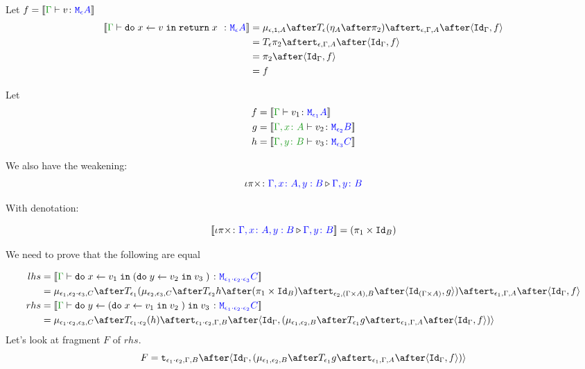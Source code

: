 \documentclass{report}
\begin{document}

Let $f = \deno{\gtyperelation{v}{\mea}}$ 
    \begin{equation}
    \begin{split}
        \deno{\gtyperelation{\doin{x}{v}{\return{x}}}{\mea}}  & = \bind{\e}{\1}{A} \after \T{\e}{(\point{A} \after \pp)} \after \tstrength{\e}{\G}{A}\after \pr{\idg}{f} \\
        & = \T{\e}{\pp} \after \tstrength{\e}{\G}{A} \after \pr {\idg}{f} \\
        & = \pp \after \pr{\idg}{f}\\
        & = f
    \end{split}
\end{equation}



Let
\begin{align*}
    f ={}& \deno{\gtyperelation{v_1}{\M{\e_1}{A}}}\\
    g ={}& \deno{\typerelation{\gax}{v_2}{\M{\e_2}{B}}}\\
    h ={}& \deno{\typerelation{\gby}{v_3}{\M{\e_3}{C}}}
\end{align*}

We also have the weakening:
\begin{equation}
    \iota\pi\times \colon {\color{blue}\Gamma, x\colon A, y: B} \triangleright {\color {blue} \Gamma, y\colon B}
\end{equation}

With denotation:

\begin{equation}
    {\bf [\![}\iota\pi\times \colon {\color{blue}\Gamma, x\colon A, y: B} \triangleright {\color {blue} \Gamma, y\colon B}{\bf ]\!]} = (\pi_1 \times \texttt{Id}_{B})
\end{equation}

We need to prove that the following are equal

\begin{align*}
    lhs & =  \deno{\gtyperelation{\doin{x}{v_1}{(\doin{y}{v_2}{v_3})}}{\M{\e_1\dot\e_2\dot\e_3}{C}}} \\
    & = \bind{\e_1}{\e_2\dot\e_3}{C}\after\T{
        \e_1}{(\bind{\e_2}{\e_3}{C}\after\T{\e_2}{h\after(\p \times \Id{B})}\after\tstrength{\e_2}{(\G\times A)}{B}\after\pr{\Id{(\G\times A)}}{g}
        )}\after\tstrength{\e_1}{\G}{A}\after\pr{\idg}{f}\\
        rhs &  = \deno{\gtyperelation{\doin{y}{(\doin{x}{v_1}{v_2})}{v_3}}{\M{\e_1\dot\e_2\dot\e_2}{C}}}  \\
    & = \bind{\e_1\dot\e_2}{\e_3}{C}\after\T{\e_1\dot\e_2}{(h)}\after\tstrength{\e_1\dot\e_2}{\G}{B}\after\pr{\idg}{(\bind{\e_1}{\e_2}{B}\after\T{\e_1}{g}\after\tstrength{\e_1}{\G}{A}\after\pr{\idg}{f})} \\
\end{align*}
Let's look at fragment $F$ of $rhs$.
\begin{equation}
    F = \tstrength{\e_1\dot\e_2}{\G}{B}\after\pr{\idg}{(\bind{\e_1}{\e_2}{B}\after\T{\e_1}{g}\after\tstrength{\e_1}{\G}{A}\after\pr{\idg}{f})}
\end{equation}
\end{document}
